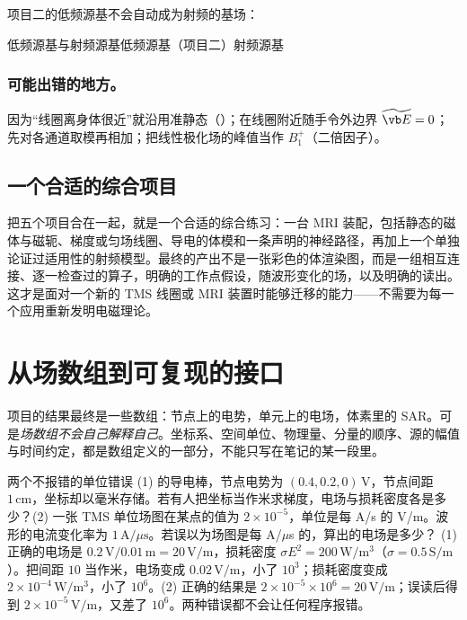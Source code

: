 项目二的低频源基不会自动成为射频的基场：
\begin{compare}{低频源基与射频源基}{低频源基（项目二）}{射频源基}
\end{compare}

\subsubsection{可能出错的地方。}
因为“线圈离身体很近”就沿用准静态（）；在线圈附近随手令外边界 $\widetilde{\vb E}=0$；先对各通道取模再相加；把线性极化场的峰值当作 $B_1^+$（二倍因子）。

\subsection{一个合适的综合项目}
把五个项目合在一起，就是一个合适的综合练习：一台 MRI 装配，包括静态的磁体与磁轭、梯度或匀场线圈、导电的体模和一条声明的神经路径，再加上一个单独论证过适用性的射频模型。最终的产出不是一张彩色的体渲染图，而是一组相互连接、逐一检查过的算子，明确的工作点假设，随波形变化的场，以及明确的读出。这才是面对一个新的 TMS 线圈或 MRI 装置时能够迁移的能力——不需要为每一个应用重新发明电磁理论。

\section{从场数组到可复现的接口}\label{sec:projects-interface}

项目的结果最终是一些数组：节点上的电势，单元上的电场，体素里的 SAR。可是\emph{场数组不会自己解释自己}。坐标系、空间单位、物理量、分量的顺序、源的幅值与时间约定，都是数组定义的一部分，不能只写在笔记的某一段里。

\begin{example}[label=ex:projects-units]{两个不报错的单位错误}
(1)  的导电棒，节点电势为 $(0.4,0.2,0)\,\mathrm V$，节点间距 $1\,\mathrm{cm}$，坐标却以毫米存储。若有人把坐标当作米求梯度，电场与损耗密度各是多少？(2) 一张 TMS 单位场图在某点的值为 $2\times10^{-5}$，单位是每 A/s 的 V/m。波形的电流变化率为 $1\,\mathrm{A}/\mu\mathrm s$。若误以为场图是每 A/$\mu$s 的，算出的电场是多少？
\solution
(1) 正确的电场是 $0.2\,\mathrm V/0.01\,\mathrm m=20\,\mathrm{V/m}$，损耗密度 $\sigma E^2=200\,\mathrm{W/m^3}$（$\sigma=0.5\,\mathrm{S/m}$）。把间距 $10$ 当作米，电场变成 $0.02\,\mathrm{V/m}$，小了 $10^3$；损耗密度变成 $2\times10^{-4}\,\mathrm{W/m^3}$，小了 $10^6$。(2) 正确的结果是 $2\times10^{-5}\times10^6=20\,\mathrm{V/m}$；误读后得到 $2\times10^{-5}\,\mathrm{V/m}$，又差了 $10^6$。两种错误都不会让任何程序报错。
\end{example}

